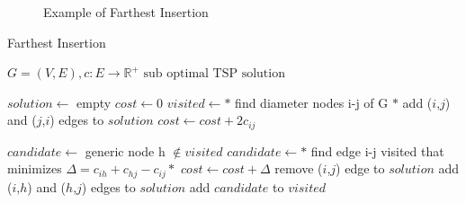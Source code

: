 \begin{figure}[!h]
    \centering
    \caption{Example of Farthest Insertion} \label{fig:extra}
\end{figure}

\begin{algorithm}[h!]
    \caption{Farthest Insertion}\label{algo:extramileage}
    \begin{algorithmic}[1]
    \Require $G = (V,E), c:E \to \mathbb{R}^+$
    \Ensure $\text{sub optimal TSP solution}$


    \State $solution \gets$ empty
    \State $cost \gets 0$
    \State $visited \gets  *$ find diameter nodes i-j of G $*$
    \State add ($i$,$j$) and ($j$,$i$) edges to $solution$
    \State $cost \gets cost + 2 c_{ij}$
   




    \State $candidate \gets $ generic node h $ \notin visited$
    \State $candidate \gets *$ find edge i-j visited that minimizes $\Delta = c_{ih} + c_{hj} - c_{ij}*$
    \State $cost \gets cost + \Delta$
    \State remove ($i$,$j$) edge to $solution$
    \State add ($i$,$h$) and ($h$,$j$) edges to $solution$
    \State add $candidate$ to $visited$


    \EndWhile






    \end{algorithmic}
\end{algorithm}

